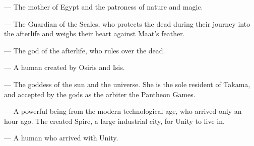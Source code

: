 \documentclass[blue]{guardians}
\begin{document}
\begin{itemz}
  \item \cIsis{} --- The mother of Egypt and the patroness of nature and magic.
  \item \cAnubis{} --- The Guardian of the Scales, who protects the dead during their journey into the afterlife and weighs their heart against Maat's feather.
  \item \cOsiris{} --- The god of the afterlife, who rules over the dead.
  \item \cEgyptianHuman{} --- A human created by Osiris and Isis.
\end{itemz}

\begin{itemz}
  \item \cAmaterasu{} --- The goddess of the sun and the universe. She is the sole resident of Takama, and accepted by the gods as the arbiter the Pantheon Games.
\end{itemz}

\begin{itemz}
  \item\cUnity{} --- A powerful being from the modern technological age, who arrived only an hour ago. The \cCaretaker{} created Spire, a large industrial city, for Unity to live in.
  \item\cKachiko{} --- A human who arrived with Unity.
\end{itemz}
\end{document}

